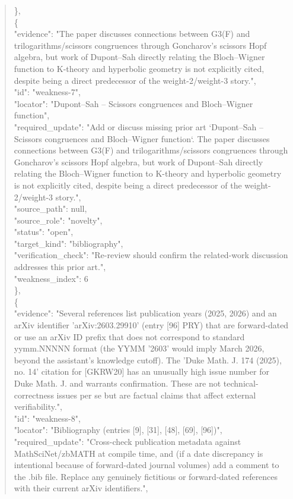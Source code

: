 \documentclass[11pt]{article}
\begin{document}
\begin{quote}
    \},\\
    \{\\
      "evidence": "The paper discusses connections between G3(F) and trilogarithms/scissors congruences through Goncharov's scissors Hopf algebra, but work of Dupont--Sah directly relating the Bloch--Wigner function to K-theory and hyperbolic geometry is not explicitly cited, despite being a direct predecessor of the weight-2/weight-3 story.",\\
      "id": "weakness-7",\\
      "locator": "Dupont--Sah -- Scissors congruences and Bloch--Wigner function",\\
      "required\_update": "Add or discuss missing prior art `Dupont--Sah -- Scissors congruences and Bloch--Wigner function`. The paper discusses connections between G3(F) and trilogarithms/scissors congruences through Goncharov's scissors Hopf algebra, but work of Dupont--Sah directly relating the Bloch--Wigner function to K-theory and hyperbolic geometry is not explicitly cited, despite being a direct predecessor of the weight-2/weight-3 story.",\\
      "source\_path": null,\\
      "source\_role": "novelty",\\
      "status": "open",\\
      "target\_kind": "bibliography",\\
      "verification\_check": "Re-review should confirm the related-work discussion addresses this prior art.",\\
      "weakness\_index": 6\\
    \},\\
    \{\\
      "evidence": "Several references list publication years (2025, 2026) and an arXiv identifier 'arXiv:2603.29910' (entry [96] PRY) that are forward-dated or use an arXiv ID prefix that does not correspond to standard yymm.NNNNN format (the YYMM '2603' would imply March 2026, beyond the assistant's knowledge cutoff). The 'Duke Math. J. 174 (2025), no. 14' citation for [GKRW20] has an unusually high issue number for Duke Math. J. and warrants confirmation. These are not technical-correctness issues per se but are factual claims that affect external verifiability.",\\
      "id": "weakness-8",\\
      "locator": "Bibliography (entries [9], [31], [48], [69], [96])",\\
      "required\_update": "Cross-check publication metadata against MathSciNet/zbMATH at compile time, and (if a date discrepancy is intentional because of forward-dated journal volumes) add a comment to the .bib file. Replace any genuinely fictitious or forward-dated references with their current arXiv identifiers.",\\

\end{quote}
\end{document}
